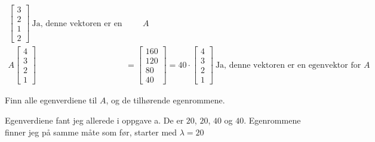 \documentclass[11pt, a4paper, norsk]{NTNUoving}
\begin{document}
\begin{oppgave}
\begin{punkt}
\begin{align*}
\begin{bmatrix}
                3 \\
                2 \\
                1 \\
                2
        \end{bmatrix} \: \text{Ja, denne vektoren er en egenvektor for } A
        \\
            A\begin{bmatrix}
                4 \\
                3 \\
                2 \\
                1
            \end{bmatrix} &= \begin{bmatrix}
                160 \\
                120 \\
                80 \\
                40
            \end{bmatrix} = 40 \cdot \begin{bmatrix}
                4 \\
                3 \\
                2 \\
                1
        \end{bmatrix} \: \text{Ja, denne vektoren er en egenvektor for } A
            \end{align*}
        \end{punkt}
        \begin{punkt}
            Finn alle egenverdiene til $A$, og de tilhørende egenrommene.

            Egenverdiene fant jeg allerede i oppgave a. De er $20$, $20$, $40$ og $40$. Egenrommene finner jeg på samme måte som før, starter med $\lambda = 20$


\end{punkt}
\end{oppgave}
\end{document}
